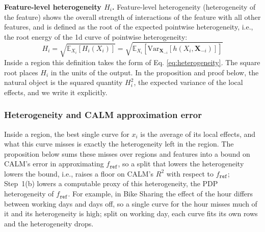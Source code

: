 \textbf{Feature-level heterogeneity $H_i$.}
Feature-level heterogeneity (heterogeneity of the feature) shows the overall strength of interactions of the feature with all other features, and is defined as the root of the expected pointwise heterogeneity, i.e., the root energy of the 1d curve of pointwise heterogeneity:
\begin{equation}
H_i = \sqrt{\mathbb{E}_{X_i}\left[H_i(X_i)\right]} = \sqrt{\mathbb{E}_{X_i}\left[\text{Var}_{\mathbf{X}_{-i}}[h(X_i, \mathbf{X}_{-i})]\right]}
\end{equation}
Inside a region this definition takes the form of Eq. \eqref{eq:heterogeneity}.
The square root places $H_i$ in the units of the output. In the proposition and proof below, the natural object is the squared quantity $H_i^2$, the expected variance of the local effects, and we write it explicitly.

\subsubsection{Heterogeneity and CALM approximation error}

Inside a region, the best single curve for $x_i$ is the average of its local effects, and what this curve misses is exactly the heterogeneity left in the region.
The proposition below sums these misses over regions and features into a bound on CALM's error in approximating $f_{\texttt{ref}}$, so a split that lowers the heterogeneity lowers the bound, i.e., raises a floor on CALM's $R^2$ with respect to $f_{\texttt{ref}}$; Step~1(b) lowers a computable proxy of this heterogeneity, the PDP heterogeneity of $f_{\texttt{ref}}$.
For example, in Bike Sharing the effect of the hour differs between working days and days off, so a single curve for the hour misses much of it and its heterogeneity is high; split on working day, each curve fits its own rows and the heterogeneity drops.

